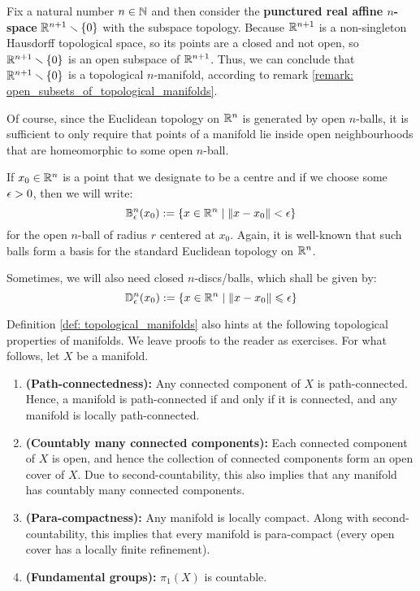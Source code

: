         \begin{example} \label{example: punctured_affine_spaces_as_topological_manifolds}
            Fix a natural number $n \in \mathbb{N}$ and then consider the \textbf{punctured real affine $n$-space} $\mathbb{R}^{n + 1} \smallsetminus \{0\}$ with the subspace topology. Because $\mathbb{R}^{n + 1}$ is a non-singleton Hausdorff topological space, so its points are a closed and not open, so $\mathbb{R}^{n + 1} \smallsetminus \{0\}$ is an open subspace of $\mathbb{R}^{n + 1}$. Thus, we can conclude that $\mathbb{R}^{n + 1} \smallsetminus \{0\}$ is a topological $n$-manifold, according to remark \ref{remark: open_subsets_of_topological_manifolds}.
        \end{example}
        
        Of course, since the Euclidean topology on $\mathbb{R}^n$ is generated by open $n$-balls, it is sufficient to only require that points of a manifold lie inside open neighbourhoods that are homeomorphic to some open $n$-ball.
        \begin{convention}
            If $x_0 \in \mathbb{R}^n$ is a point that we designate to be a centre and if we choose some $\epsilon > 0$, then we will write:
                $$\mathbb{B}^n_\epsilon(x_0) := \{ x \in \mathbb{R}^n \mid \| x - x_0 \| < \epsilon \}$$
            for the open $n$-ball of radius $r$ centered at $x_0$. Again, it is well-known that such balls form a basis for the standard Euclidean topology on $\mathbb{R}^n$.

            Sometimes, we will also need closed $n$-discs/balls, which shall be given by:
                $$\mathbb{D}^n_\epsilon(x_0) := \{ x \in \mathbb{R}^n \mid \| x - x_0 \| \leqslant \epsilon \}$$
        \end{convention}
        \begin{remark}
            Definition \ref{def: topological_manifolds} also hints at the following topological properties of manifolds. We leave proofs to the reader as exercises. For what follows, let $X$ be a manifold.
            \begin{enumerate}
                \item \textbf{(Path-connectedness):} Any connected component of $X$ is path-connected. Hence, a manifold is path-connected if and only if it is connected, and any manifold is locally path-connected.
                \item \textbf{(Countably many connected components):} Each connected component of $X$ is open, and hence the collection of connected components form an open cover of $X$. Due to second-countability, this also implies that any manifold has countably many connected components.
                \item \textbf{(Para-compactness):} Any manifold is locally compact. Along with second-countability, this implies that every manifold is para-compact (every open cover has a locally finite refinement).
                \item \textbf{(Fundamental groups):} $\pi_1(X)$ is countable.
            \end{enumerate}
        \end{remark}

